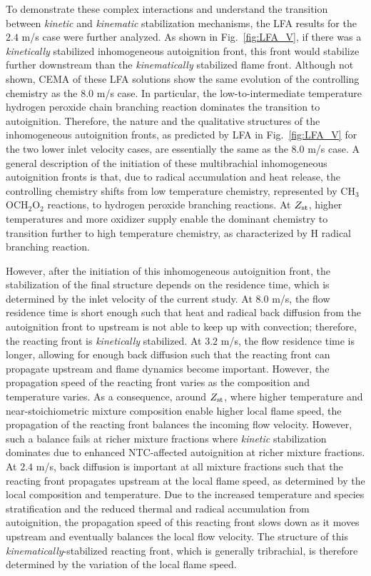 \documentclass[review,3p,times]{elsarticle}
\begin{document}
To demonstrate these complex interactions and understand the transition between \emph{kinetic} and \emph{kinematic} stabilization mechanisms, the LFA results for the $2.4$ m/s case were further analyzed.  As shown in Fig.~\ref{fig:LFA_V}, if there was a \emph{kinetically} stabilized inhomogeneous autoignition front, this front would stabilize further downstream than the \emph{kinematically} stabilized flame front.  Although not shown, CEMA of these LFA solutions show the same evolution of the controlling chemistry as the $8.0$ m/s case.  In particular, the low-to-intermediate temperature hydrogen peroxide chain branching reaction dominates the transition to autoignition.  Therefore, the nature and the qualitative structures of the inhomogeneous autoignition fronts, as predicted by LFA in Fig.~\ref{fig:LFA_V} for the two lower inlet velocity cases, are essentially the same as the $8.0$ m/s case.  A general description of the initiation of these multibrachial inhomogeneous autoignition fronts is that, due to radical accumulation and heat release, the controlling chemistry shifts from low temperature chemistry, represented by CH$_3$OCH$_2$O$_2$ reactions, to hydrogen peroxide branching reactions.  At $Z_{\rm st}$, higher temperatures and more oxidizer supply enable the dominant chemistry to transition further to high temperature chemistry, as characterized by H radical branching reaction.   

However, after the initiation of this inhomogeneous autoignition front, the stabilization of the final structure depends on the residence time, which is determined by the inlet velocity of the current study.  At $8.0$ m/s, the flow residence time is short enough such that heat and radical back diffusion from the autoignition front to upstream is not able to keep up with convection; therefore, the reacting front is \emph{kinetically} stabilized.  At $3.2$ m/s, the flow residence time is longer, allowing for enough back diffusion such that the reacting front can propagate upstream and flame dynamics become important.  However, the propagation speed of the reacting front varies as the composition and temperature varies.  As a consequence, around $Z_{\rm st}$, where higher temperature and near-stoichiometric mixture composition enable higher local flame speed, the propagation of the reacting front balances the incoming flow velocity.  However, such a balance fails at richer mixture fractions where \emph{kinetic} stabilization dominates due to enhanced NTC-affected autoignition at richer mixture fractions.  At $2.4$ m/s, back diffusion is important at all mixture fractions such that the reacting front propagates upstream at the local flame speed, as determined by the local composition and temperature.  Due to the increased temperature and species stratification and the reduced thermal and radical accumulation from autoignition, the propagation speed of this reacting front slows down as it moves upstream and eventually balances the local flow velocity.  The structure of this \emph{kinematically}-stabilized reacting front, which is generally tribrachial, is therefore determined by the variation of the local flame speed. 
\end{document}
